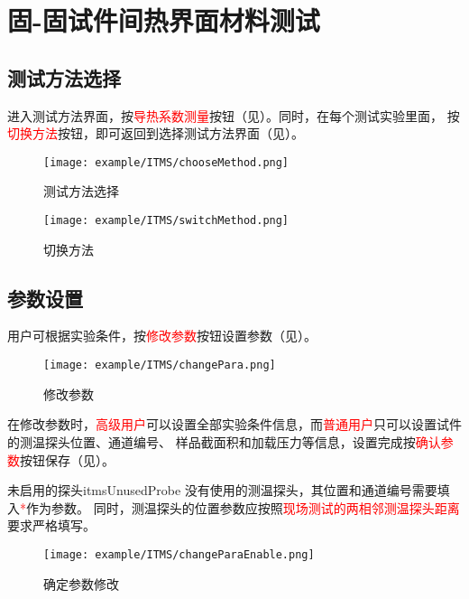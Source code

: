 \section{固-固试件间热界面材料测试}
\subsection{测试方法选择}
进入测试方法界面，按\textcolor{red}{导热系数测量}按钮（见）。同时，在每个测试实验里面，
按\textcolor{red}{切换方法}按钮，即可返回到选择测试方法界面（见）。
\begin{figure}[H]
	\centering
	\texttt{[image: example/ITMS/chooseMethod.png]}
	\caption{ 测试方法选择 \label{fig:exmp_itms_chooseMethod}}
\end{figure}

\begin{figure}[H]
	\centering
	\texttt{[image: example/ITMS/switchMethod.png]}
	\caption{ 切换方法 \label{fig:exmp_itms_switchMethod}}
\end{figure}

\subsection{参数设置}
用户可根据实验条件，按\textcolor{red}{修改参数}按钮设置参数（见）。
\begin{figure}[H]
	\centering
	\texttt{[image: example/ITMS/changePara.png]}
	\caption{ 修改参数 \label{fig:exmp_itms_changePara}}
\end{figure}
在修改参数时，\textcolor{red}{高级用户}可以设置全部实验条件信息，而\textcolor{red}{普通用户}只可以设置试件的测温探头位置、通道编号、
样品截面积和加载压力等信息，设置完成按\textcolor{red}{确认参数}按钮保存（见）。
\begin{tips}{未启用的探头}{itmsUnusedProbe}
没有使用的测温探头，其位置和通道编号需要填入\textcolor{red}{*}作为参数。
同时，测温探头的位置参数应按照\textcolor{red}{现场测试的两相邻测温探头距离}要求严格填写。
\end{tips}
\begin{figure}[H]
	\centering
	\texttt{[image: example/ITMS/changeParaEnable.png]}
	\caption{ 确定参数修改 \label{fig:exmp_itms_changeParaEnable}}
\end{figure}
